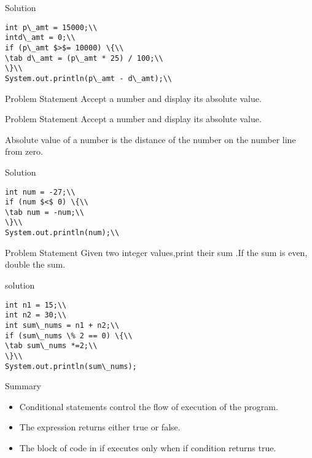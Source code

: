 \documentclass[aspectratio=169,14pt,usenames,dvipsnames]{beamer}
\newcommand\tab[1][1cm]{\hspace*{#1}}
\begin{document}
\begin{frame}{Solution}
\begin{lstlisting}
int p\_amt = 15000;\\
intd\_amt = 0;\\
if (p\_amt $>$= 10000) \{\\
\tab d\_amt = (p\_amt * 25) / 100;\\
\}\\
System.out.println(p\_amt - d\_amt);\\
\end{lstlisting}
\end{frame}

\begin{frame}{Problem Statement}
Accept a number and display its absolute value.
\end{frame}

\begin{frame}{Problem Statement}
Accept a number and display its absolute value.
\begin{block}{Absolute value of a number is the distance of the number on the number line from zero.}
\end{block}
\end{frame}

\begin{frame}{Solution}
\begin{lstlisting}
int num = -27;\\
if (num $<$ 0) \{\\
\tab num = -num;\\
\}\\
System.out.println(num);\\
\end{lstlisting}
\end{frame}


\begin{frame}{Problem Statement}
Given two integer values,print their sum .If the sum is even, double the sum.
\end{frame}

\begin{frame}{solution}
\begin{lstlisting}
int n1 = 15;\\
int n2 = 30;\\
int sum\_nums = n1 + n2;\\
if (sum\_nums \% 2 == 0) \{\\
\tab sum\_nums *=2;\\
\}\\
System.out.println(sum\_nums);
\end{lstlisting}
\end{frame}

\begin{frame}{Summary}
\begin{itemize}
    \item Conditional statements control the flow of
execution of the program.
\item The expression returns either true or false.
\item The block of code in if executes only when
if condition returns true.
\end{itemize}
\end{frame}
\end{document}
